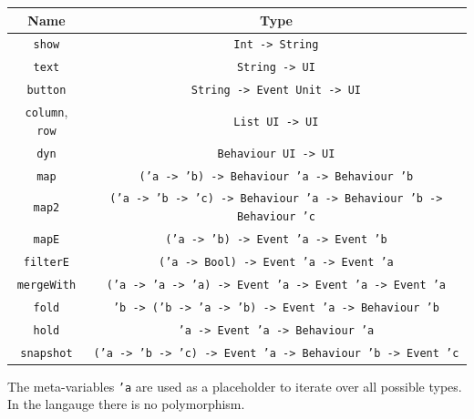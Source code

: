 \begin{center}
  \begin{tabular}{c | c}
    Name & Type\\
    \hline
    \texttt{show} & \texttt{Int -> String}\\
    \hline
    \texttt{text} & \texttt{String -> UI}\\
    \hline
    \texttt{button} & \texttt{String -> Event Unit -> UI}\\
    \hline
    \texttt{column}, \texttt{row} & \texttt{List UI -> UI}\\
    \hline
    \texttt{dyn} & \texttt{Behaviour UI -> UI}\\
    \hline
    \texttt{map} & \texttt{('a -> 'b) -> Behaviour 'a -> Behaviour 'b}\\
    \hline
    \texttt{map2} & \texttt{('a -> 'b -> 'c) -> Behaviour 'a -> Behaviour 'b -> Behaviour 'c}\\
    \hline
    \texttt{mapE} & \texttt{('a -> 'b) -> Event 'a -> Event 'b}\\
    \hline
    \texttt{filterE} & \texttt{('a -> Bool) -> Event 'a -> Event 'a}\\
    \hline
    \texttt{mergeWith} & \texttt{('a -> 'a -> 'a) -> Event 'a -> Event 'a -> Event 'a}\\
    \hline
    \texttt{fold} & \texttt{'b -> ('b -> 'a -> 'b) -> Event 'a -> Behaviour 'b}\\
    \hline
    \texttt{hold} & \texttt{'a -> Event 'a -> Behaviour 'a}\\
    \hline
    \texttt{snapshot} & \texttt{('a -> 'b -> 'c) -> Event 'a -> Behaviour 'b -> Event 'c}\\
\end{tabular}
\end{center}

The meta-variables \texttt{'a} are used as a placeholder to iterate over all possible types. In the langauge there is no polymorphism.
